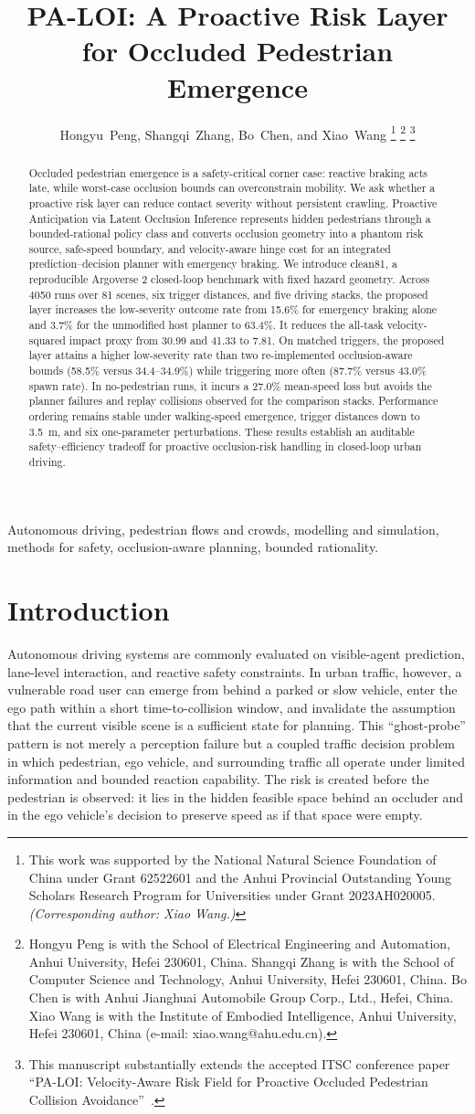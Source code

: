 \documentclass[journal]{IEEEtran}
\title{PA-LOI: A Proactive Risk Layer for Occluded Pedestrian Emergence}
\author{Hongyu~Peng, Shangqi~Zhang, Bo~Chen, and Xiao~Wang%
\thanks{This work was supported by the National Natural Science Foundation of China under Grant 62522601 and the Anhui Provincial Outstanding Young Scholars Research Program for Universities under Grant 2023AH020005. \emph{(Corresponding author: Xiao Wang.)}}%
\thanks{Hongyu Peng is with the School of Electrical Engineering and Automation, Anhui University, Hefei 230601, China. Shangqi Zhang is with the School of Computer Science and Technology, Anhui University, Hefei 230601, China. Bo Chen is with Anhui Jianghuai Automobile Group Corp., Ltd., Hefei, China. Xiao Wang is with the Institute of Embodied Intelligence, Anhui University, Hefei 230601, China (e-mail: xiao.wang@ahu.edu.cn).}%
\thanks{This manuscript substantially extends the accepted ITSC conference paper ``PA-LOI: Velocity-Aware Risk Field for Proactive Occluded Pedestrian Collision Avoidance''~\cite{paloi_itsc2026}.}}
\begin{document}
\maketitle

\begin{abstract}
Occluded pedestrian emergence is a safety-critical corner case: reactive braking acts late, while worst-case occlusion bounds can overconstrain mobility. We ask whether a proactive risk layer can reduce contact severity without persistent crawling. Proactive Anticipation via Latent Occlusion Inference represents hidden pedestrians through a bounded-rational policy class and converts occlusion geometry into a phantom risk source, safe-speed boundary, and velocity-aware hinge cost for an integrated prediction--decision planner with emergency braking. We introduce clean81, a reproducible Argoverse 2 closed-loop benchmark with fixed hazard geometry. Across 4050 runs over 81 scenes, six trigger distances, and five driving stacks, the proposed layer increases the low-severity outcome rate from 15.6\% for emergency braking alone and 3.7\% for the unmodified host planner to 63.4\%. It reduces the all-task velocity-squared impact proxy from 30.99 and 41.33 to 7.81. On matched triggers, the proposed layer attains a higher low-severity rate than two re-implemented occlusion-aware bounds (58.5\% versus 34.4--34.9\%) while triggering more often (87.7\% versus 43.0\% spawn rate). In no-pedestrian runs, it incurs a 27.0\% mean-speed loss but avoids the planner failures and replay collisions observed for the comparison stacks. Performance ordering remains stable under walking-speed emergence, trigger distances down to \SI{3.5}{m}, and six one-parameter perturbations. These results establish an auditable safety--efficiency tradeoff for proactive occlusion-risk handling in closed-loop urban driving.
\end{abstract}

\begin{IEEEkeywords}
Autonomous driving, pedestrian flows and crowds, modelling and simulation, methods for safety, occlusion-aware planning, bounded rationality.
\end{IEEEkeywords}

\section{Introduction}

Autonomous driving systems are commonly evaluated on visible-agent prediction, lane-level interaction, and reactive safety constraints. In urban traffic, however, a vulnerable road user can emerge from behind a parked or slow vehicle, enter the ego path within a short time-to-collision window, and invalidate the assumption that the current visible scene is a sufficient state for planning. This ``ghost-probe'' pattern is not merely a perception failure but a coupled traffic decision problem in which pedestrian, ego vehicle, and surrounding traffic all operate under limited information and bounded reaction capability. The risk is created before the pedestrian is observed: it lies in the hidden feasible space behind an occluder and in the ego vehicle's decision to preserve speed as if that space were empty.
\end{document}
